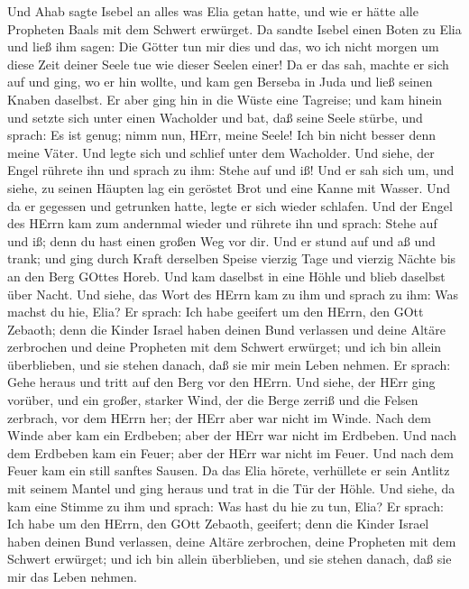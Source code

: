  Und Ahab sagte Isebel an alles was Elia getan hatte, und
wie er hätte alle Propheten Baals mit dem Schwert erwürget. 
Da sandte Isebel einen Boten zu Elia und ließ ihm sagen: Die Götter tun
mir dies und das, wo ich nicht morgen um diese Zeit deiner Seele tue wie
dieser Seelen einer!  Da er das sah, machte er sich auf und
ging, wo er hin wollte, und kam gen Berseba in Juda und ließ seinen
Knaben daselbst.  Er aber ging hin in die Wüste eine
Tagreise; und kam hinein und setzte sich unter einen Wacholder und bat,
daß seine Seele stürbe, und sprach: Es ist genug; nimm nun, HErr, meine
Seele! Ich bin nicht besser denn meine Väter.  Und legte
sich und schlief unter dem Wacholder. Und siehe, der Engel rührete ihn
und sprach zu ihm: Stehe auf und iß!  Und er sah sich um,
und siehe, zu seinen Häupten lag ein geröstet Brot und eine Kanne mit
Wasser. Und da er gegessen und getrunken hatte, legte er sich wieder
schlafen.  Und der Engel des HErrn kam zum andernmal wieder
und rührete ihn und sprach: Stehe auf und iß; denn du hast einen großen
Weg vor dir.  Und er stund auf und aß und trank; und ging
durch Kraft derselben Speise vierzig Tage und vierzig Nächte bis an den
Berg GOttes Horeb.  Und kam daselbst in eine Höhle und blieb
daselbst über Nacht. Und siehe, das Wort des HErrn kam zu ihm und sprach
zu ihm: Was machst du hie, Elia?  Er sprach: Ich habe
geeifert um den HErrn, den GOtt Zebaoth; denn die Kinder Israel haben
deinen Bund verlassen und deine Altäre zerbrochen und deine Propheten
mit dem Schwert erwürget; und ich bin allein überblieben, und sie stehen
danach, daß sie mir mein Leben nehmen.  Er sprach: Gehe
heraus und tritt auf den Berg vor den HErrn. Und siehe, der HErr ging
vorüber, und ein großer, starker Wind, der die Berge zerriß und die
Felsen zerbrach, vor dem HErrn her; der HErr aber war nicht im Winde.
Nach dem Winde aber kam ein Erdbeben; aber der HErr war nicht im
Erdbeben.  Und nach dem Erdbeben kam ein Feuer; aber der
HErr war nicht im Feuer. Und nach dem Feuer kam ein still sanftes
Sausen.  Da das Elia hörete, verhüllete er sein Antlitz mit
seinem Mantel und ging heraus und trat in die Tür der Höhle. Und siehe,
da kam eine Stimme zu ihm und sprach: Was hast du hie zu tun, Elia?
 Er sprach: Ich habe um den HErrn, den GOtt Zebaoth,
geeifert; denn die Kinder Israel haben deinen Bund verlassen, deine
Altäre zerbrochen, deine Propheten mit dem Schwert erwürget; und ich bin
allein überblieben, und sie stehen danach, daß sie mir das Leben nehmen.
